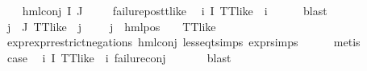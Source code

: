 \begin{isabellebody}
\isanewline
\ \ \isamarkupfalse%
\ {\isacharparenleft}{\kern0pt}hml{\isacharunderscore}{\kern0pt}conj\ I\ J\ {\isasymPhi}{\isacharparenright}{\kern0pt}\isanewline
\ \ \isamarkupfalse%
\ failure{\isacharunderscore}{\kern0pt}pos{\isacharunderscore}{\kern0pt}tt{\isacharunderscore}{\kern0pt}like\ \isamarkupfalse%
\ {\isachardoublequoteopen}{\isasymforall}i\ {\isasymin}I{\isachardot}{\kern0pt}\ TT{\isacharunderscore}{\kern0pt}like\ {\isacharparenleft}{\kern0pt}{\isasymPhi}\ i{\isacharparenright}{\kern0pt}{\isachardoublequoteclose}\isanewline
\ \ \ \ \isamarkupfalse%
\ blast\isanewline
\ \ \isamarkupfalse%
\ {\isachardoublequoteopen}{\isacharparenleft}{\kern0pt}{\isasymforall}j\ {\isasymin}\ J{\isachardot}{\kern0pt}\ {\isacharparenleft}{\kern0pt}TT{\isacharunderscore}{\kern0pt}like\ {\isacharparenleft}{\kern0pt}{\isasymPhi}\ j{\isacharparenright}{\kern0pt}{\isacharparenright}{\kern0pt}\ {\isasymor}\ {\isacharparenleft}{\kern0pt}{\isasymexists}{\isasymalpha}\ {\isasymchi}{\isachardot}{\kern0pt}\ {\isacharparenleft}{\kern0pt}{\isacharparenleft}{\kern0pt}{\isasymPhi}\ j{\isacharparenright}{\kern0pt}\ {\isacharequal}{\kern0pt}\ hml{\isacharunderscore}{\kern0pt}pos\ {\isasymalpha}\ {\isasymchi}\ {\isasymand}\ {\isacharparenleft}{\kern0pt}TT{\isacharunderscore}{\kern0pt}like\ {\isasymchi}{\isacharparenright}{\kern0pt}{\isacharparenright}{\kern0pt}{\isacharparenright}{\kern0pt}{\isacharparenright}{\kern0pt}{\isachardoublequoteclose}\isanewline
\ \ \ \ \isamarkupfalse%
\ expr{\isacharunderscore}{\kern0pt}{}{\isacharunderscore}{\kern0pt}expr{\isacharunderscore}{\kern0pt}{}{\isacharunderscore}{\kern0pt}restrict{\isacharunderscore}{\kern0pt}negations\ hml{\isacharunderscore}{\kern0pt}conj{\isacharparenleft}{\kern0pt}{}{\isacharparenright}{\kern0pt}\ less{\isacharunderscore}{\kern0pt}eq{\isacharunderscore}{\kern0pt}t{\isachardot}{\kern0pt}simps\ expr{\isachardot}{\kern0pt}simps\isanewline
\ \ \ \ \isamarkupfalse%
\ metis\isanewline
\ \ \isamarkupfalse%
\ \isamarkupfalse%
\ {\isacharquery}{\kern0pt}case\ \isamarkupfalse%
\ {\isacartoucheopen}{\isasymforall}i\ {\isasymin}I{\isachardot}{\kern0pt}\ TT{\isacharunderscore}{\kern0pt}like\ {\isacharparenleft}{\kern0pt}{\isasymPhi}\ i{\isacharparenright}{\kern0pt}{\isacartoucheclose}\ failure{\isacharunderscore}{\kern0pt}conj\ \isanewline
\ \ \ \ \isamarkupfalse%
\ blast\isanewline
{}\isamarkupfalse%
%

\end{isabellebody}
